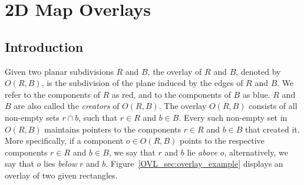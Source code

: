 



\chapter{2D Map Overlays}
\label{chap:intro_ref}
\section{Introduction}

Given two planar subdivisions $R$ and $B$, 
the overlay of $R$ and $B$, 
denoted by $O(R,B)$, is the subdivision of the plane 
induced by the edges of $R$ and $B$.
We refer to the components of $R$ as red, 
and to the components of $B$ as blue.
$R$ and $B$ are also called the {\em creators} of $O(R,B)$.
The overlay $O(R,B)$ consists of all non-empty sets $r \cap b$, 
such that $r \in R$ and $b \in B$. 
Every such non-empty set in $O(R,B)$ maintains 
pointers to the components $r \in R$ and $b \in B$ that created it.
More specifically, if a component $o \in O(R,B)$ points 
to the respective components $r \in R$ and $b \in B$, 
we say that $r$ and $b$ lie {\em above} $o$, 
alternatively, we say that $o$ lies {\em below} $r$ and $b$.
Figure~\ref{OVL_sec:overlay_example} displays an overlay 
of two given rectangles.

